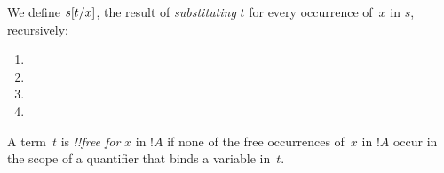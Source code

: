 \documentclass[../../../include/open-logic-section]{subfiles}
\begin{document}


\begin{defn}
We define $s[t/x]$, the result of \emph{substituting} $t$
for every occurrence of~$x$ in $s$, recursively:
\begin{enumerate}
\item {}

\item {}

\item {}

\item{}
\end{enumerate}
\end{defn}

\begin{defn}
A term~$t$ is \emph{!!{free for}} $x$ in $!A$ if none of the free occurrences
of~$x$ in $!A$ occur in the scope of a quantifier that binds a
variable in~$t$.
\end{defn}
\end{document}
